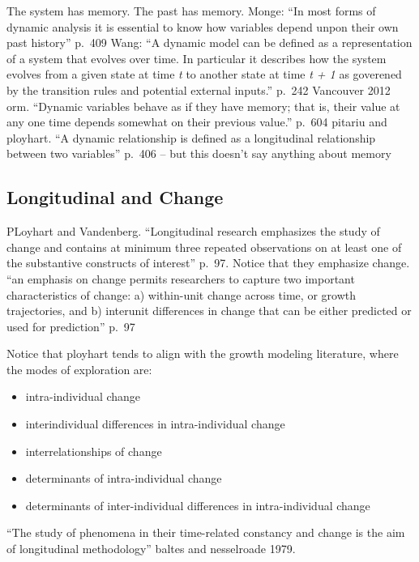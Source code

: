 \documentclass[english,,man]{apa6}
\providecommand{\tightlist}{%
  \setlength{\itemsep}{0pt}\setlength{\parskip}{0pt}}
\theoremstyle{definition}
\theoremstyle{definition}
\theoremstyle{definition}
\theoremstyle{remark}
\begin{document}
The system has memory. The past has memory. Monge: \enquote{In most
forms of dynamic analysis it is essential to know how variables depend
unpon their own past history} p.~409 Wang: \enquote{A dynamic model can
be defined as a representation of a system that evolves over time. In
particular it describes how the system evolves from a given state at
time \emph{t} to another state at time \emph{t + 1} as goverened by the
transition rules and potential external inputs.} p.~242 Vancouver 2012
orm. \enquote{Dynamic variables behave as if they have memory; that is,
their value at any one time depends somewhat on their previous value.}
p.~604 pitariu and ployhart. \enquote{A dynamic relationship is defined
as a longitudinal relationship between two variables} p.~406 -- but this
doesn't say anything about memory

\hypertarget{longitudinal-and-change}{%
\subsection{Longitudinal and Change}\label{longitudinal-and-change}}

PLoyhart and Vandenberg. \enquote{Longitudinal research emphasizes the
study of change and contains at minimum three repeated observations on
at least one of the substantive constructs of interest} p.~97. Notice
that they emphasize change. \enquote{an emphasis on change permits
researchers to capture two important characteristics of change: a)
within-unit change across time, or growth trajectories, and b) interunit
differences in change that can be either predicted or used for
prediction} p.~97

Notice that ployhart tends to align with the growth modeling literature,
where the modes of exploration are:

\begin{itemize}
\tightlist
\item
  intra-individual change
\item
  interindividual differences in intra-individual change
\item
  interrelationships of change
\item
  determinants of intra-individual change
\item
  determinants of inter-individual differences in intra-individual
  change
\end{itemize}

\noindent \enquote{The study of phenomena in their time-related
constancy and change is the aim of longitudinal methodology} baltes and
nesselroade 1979.
\end{document}
